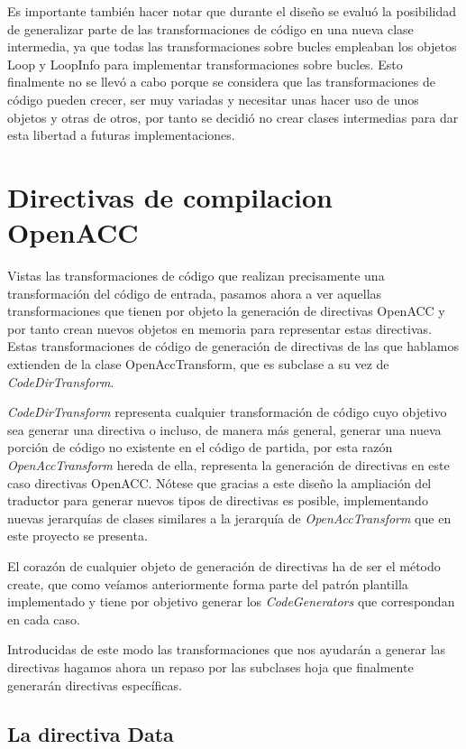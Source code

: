 Es importante también hacer notar que durante el diseño se evaluó la posibilidad de generalizar parte de las transformaciones de código en una nueva clase intermedia, ya que todas las transformaciones sobre bucles empleaban los objetos Loop y LoopInfo para implementar transformaciones sobre bucles. Esto finalmente no se llevó a cabo porque se considera que las transformaciones de código pueden crecer, ser muy variadas y necesitar unas hacer uso de unos objetos y otras de otros, por tanto se decidió no crear clases intermedias para dar esta libertad a futuras implementaciones.

\section{Directivas de compilacion OpenACC}

Vistas las transformaciones de código que realizan precisamente una transformación del código de entrada, pasamos ahora a ver aquellas transformaciones que tienen por objeto la generación de directivas OpenACC y por tanto crean nuevos objetos en memoria para representar estas directivas. Estas transformaciones de código de generación de directivas de las que hablamos extienden de la clase OpenAccTransform, que es subclase a su vez de \textit{CodeDirTransform}.

\textit{CodeDirTransform} representa cualquier transformación de código cuyo objetivo sea generar una directiva o incluso, de manera más general, generar una nueva porción de código no existente en el código de partida, por esta razón \textit{OpenAccTransform} hereda de ella, representa la generación de directivas en este caso directivas OpenACC. Nótese que gracias a este diseño la ampliación del traductor para generar nuevos tipos de directivas es posible, implementando nuevas jerarquías de clases similares a la jerarquía de \textit{OpenAccTransform} que en este proyecto se presenta.

El corazón de cualquier objeto de generación de directivas ha de ser el método create, que como veíamos anteriormente forma parte del patrón plantilla implementado y tiene por objetivo generar los \textit{CodeGenerators} que correspondan en cada caso.


Introducidas de este modo las transformaciones que nos ayudarán a generar las directivas hagamos ahora un repaso por las subclases hoja que finalmente generarán directivas específicas.

\subsection{La directiva Data}

